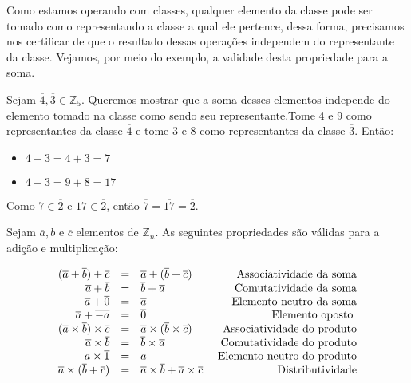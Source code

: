 Como estamos operando com classes, qualquer elemento da classe pode ser tomado como representando 
a classe a qual ele pertence, dessa forma, precisamos nos certificar de que o resultado dessas opera\c{c}\~{o}es 
independem do representante da classe. Vejamos, por meio do exemplo, a validade desta propriedade para a soma.

Sejam $\overline{4},\overline{3}\in\mathbb{Z}_{5}$. Queremos mostrar que a soma desses elementos independe do 
elemento tomado na classe como sendo seu representante.Tome 4 e 9 como representantes da classe $\overline{4}$ e
tome 3 e 8 como representantes da classe $\overline{3}$. Ent\~{a}o:
				\begin{itemize}
					\item $\overline{4}+\overline{3}=\overline{4+3}=\overline{7}$
					\item $\overline{4}+\overline{3}=\overline{9+8}=\overline{17}$ 
				\end{itemize}
Como $7\in\overline{2}$ e $17\in\overline{2}$, ent\~{a}o $\overline{7}=\overline{17}=\overline{2}$.

Sejam $\overline{a}, \overline{b}$ e $\overline{c}$ elementos de $\mathbb{Z}_{n}$. 
As seguintes propriedades s\~{a}o v\'{a}lidas para a adi\c{c}\~{a}o e multiplica\c{c}\~{a}o:

\[
\begin{array}{rclr}
(\overline{a}+\overline{b})+\overline{c} &=& \overline{a}+(\overline{b}+\overline{c}) & \hfill\textrm{ Associatividade da soma}\\
\overline{a}+\overline{b}									 &=& \overline{b}+\overline{a} 								& \hfill\textrm{ Comutatividade da soma}\\
\overline{a}+\overline{0} 							 &=& \overline{a} 														& \hfill\textrm{ Elemento neutro da soma}\\
\overline{a}+\overline{-a}							 &=& \overline{0} 														& \hfill\textrm{ Elemento oposto }\\
(\overline{a}\times\overline{b})\times\overline{c} &=& \overline{a}\times(\overline{b}\times\overline{c}) & \hfill\textrm{ Associatividade do produto}\\
\overline{a}\times\overline{b}								 &=& \overline{b}\times\overline{a} 								& \hfill\textrm{ Comutatividade do produto}\\
\overline{a}\times\overline{1} 							 &=& \overline{a} 														& \hfill\textrm{ Elemento neutro do produto}\\
\overline{a}\times(\overline{b}+\overline{c})&=& \overline{a}\times\overline{b}+\overline{a}\times\overline{c} 														& \hfill\textrm{ Distributividade}\\
\end{array}
\]

